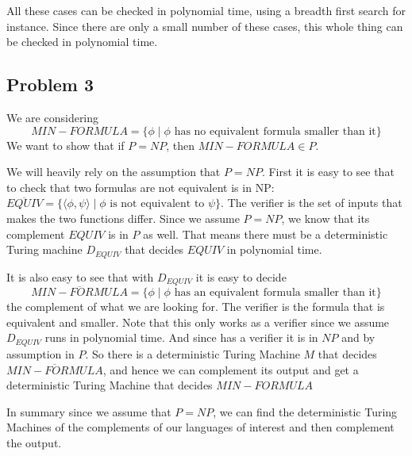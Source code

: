 \documentclass[english]{article}
\begin{document}
All these cases can be checked in polynomial time, using a breadth first search for instance. Since there are only
a small number of these cases, this whole thing can be checked in polynomial time. 



\subsection*{Problem 3}
We are considering 
\[ MIN-FORMULA = \{ \phi \mid \phi \textrm{ has no equivalent formula smaller than it}\} \]
We want to show that if $P = NP$, then $MIN-FORMULA \in P$.

We will heavily rely on the assumption that $P = NP$. First it is easy to see that to check that two formulas are
not equivalent is in NP: $\overline{EQUIV} =
\{ \langle \phi, \psi \rangle \mid \phi \textrm{ is not equivalent to }\psi \}$. The verifier is the set of inputs
that makes the two functions differ. Since we assume $P = NP$, we know that its complement $EQUIV$ is in $P$ as well. 
That means there must be a deterministic Turing machine $D_{EQUIV}$ that decides $EQUIV$ in polynomial time.

It is also easy to see that with $D_{EQUIV}$ it is easy to decide
\[ \overline{MIN-FORMULA} = \{ \phi \mid \phi \textrm{ has an equivalent formula smaller than it}\} \]
the complement
of what we are looking for. The verifier is the formula that is equivalent and smaller. Note that this only works as
a verifier since we assume $D_{EQUIV}$ runs in polynomial time. And since has a verifier it is in $NP$ and by 
assumption in $P$. So there is a deterministic Turing Machine $M$ that decides $\overline{MIN-FORMULA}$, and hence
we can complement its output and get a deterministic Turing Machine that decides ${MIN-FORMULA}$

In summary since we assume that $P = NP$, we can find the deterministic Turing Machines of the complements of our
languages of interest and then complement the output.
\end{document}
